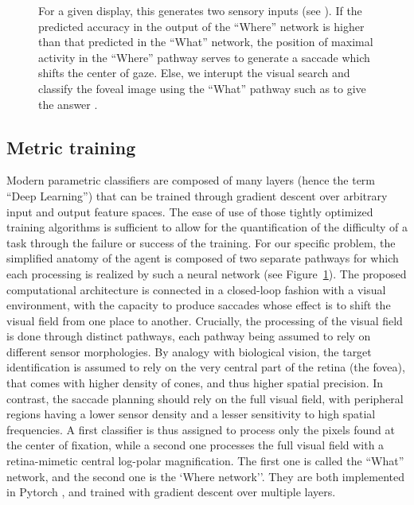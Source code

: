 \begin{figure}[t!]
{		\D
		For a given display, this generates two sensory inputs (see \B ).
		If the predicted accuracy in the output of the ``Where'' network is higher than that predicted in the ``What'' network, the position of maximal activity in the ``Where'' pathway serves to generate a saccade which shifts the center of gaze. Else, we interupt the visual search and classify the foveal image using the ``What'' pathway such as to give the answer \ANS . %
		\label{fig:methods}}%
\end{figure}%


\subsection{Metric training}

Modern parametric classifiers are composed of many layers (hence the term ``Deep Learning'') that can be trained through gradient descent over arbitrary input and output feature spaces. The ease of use of those tightly optimized training algorithms is sufficient to allow for the quantification of the difficulty of a task through the failure or success of the training.
For our specific problem, the simplified anatomy of the agent is composed of two separate pathways for which each processing is realized by such a neural network (see Figure~\ref{fig:methods}). The proposed computational architecture is connected in a closed-loop fashion with a visual environment, with the capacity to produce saccades whose effect is to shift the visual field from one place to another. Crucially, the processing of the visual field is done through distinct pathways,  each pathway being assumed to rely on different sensor morphologies. By analogy with biological vision, the target identification is assumed to rely on the very central part of the retina (the fovea), that comes with higher density of cones, and thus higher spatial precision. In contrast, the  saccade planning should rely on the full visual field, with peripheral regions having a lower sensor density and a lesser sensitivity to high spatial frequencies. A first classifier is thus assigned to process only the pixels found at the center of fixation, while a second one processes the full visual field with a retina-mimetic central log-polar magnification.  The first one is called the ``What'' network, and the second one is the `Where network''. They are both implemented in Pytorch \cite{NEURIPS2019_9015}, and trained with gradient descent over multiple layers.

